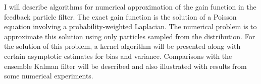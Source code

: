 I will describe algorithms for numerical approximation of the gain function in the feedback particle filter. The exact gain function is the solution of a Poisson equation involving a probability-weighted Laplacian. The numerical problem is to approximate this solution using only particles sampled from the distribution.  For the solution of this problem, a kernel algorithm will be presented along with certain asymptotic estimates for bias and variance.  Comparisons with the ensemble Kalman filter will be described and also illustrated with results from some numerical experiments.   